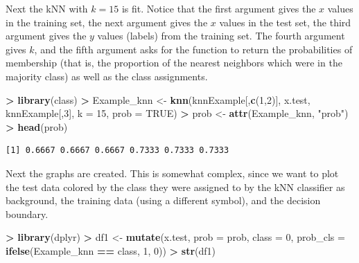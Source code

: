 \documentclass[
]{krantz}
\makeatletter
\newenvironment{Shaded}{\begin{snugshade}}{\end{snugshade}}
\newcommand{\DataTypeTok}[1]{\textcolor[rgb]{0.27,0.27,0.27}{#1}}
\newcommand{\DecValTok}[1]{\textcolor[rgb]{0.06,0.06,0.06}{#1}}
\newcommand{\KeywordTok}[1]{\textcolor[rgb]{0.27,0.27,0.27}{\textbf{#1}}}
\newcommand{\NormalTok}[1]{#1}
\newcommand{\OperatorTok}[1]{\textcolor[rgb]{0.43,0.43,0.43}{\textbf{#1}}}
\newcommand{\OtherTok}[1]{\textcolor[rgb]{0.37,0.37,0.37}{#1}}
\newcommand{\StringTok}[1]{\textcolor[rgb]{0.5,0.5,0.5}{#1}}
\newenvironment{kframe}{%
\medskip{}
\setlength{\fboxsep}{.8em}
 \def\at@end@of@kframe{}%
 \ifinner\ifhmode%
  \def\at@end@of@kframe{\end{minipage}}%
  \begin{minipage}{\columnwidth}%
 \fi\fi%
 \def\FrameCommand##1{\hskip\@totalleftmargin \hskip-\fboxsep
 \colorbox{shadecolor}{##1}\hskip-\fboxsep
     \hskip-\linewidth \hskip-\@totalleftmargin \hskip\columnwidth}%
 \MakeFramed {\advance\hsize-\width
   \@totalleftmargin\z@ \linewidth\hsize
   \@setminipage}}%
 {\par\unskip\endMakeFramed%
 \at@end@of@kframe}
\renewenvironment{Shaded}{\begin{kframe}}{\end{kframe}}
\makeatother
\begin{document}
Next the kNN with \(k=15\) is fit. Notice that the first argument gives the \(x\) values in the training set, the next argument gives the \(x\) values in the test set, the third argument gives the \(y\) values (labels) from the training set. The fourth argument gives \(k\), and the fifth argument asks for the function to return the probabilities of membership (that is, the proportion of the nearest neighbors which were in the majority class) as well as the class assignments.

\begin{Shaded}
\begin{Highlighting}[]
\OperatorTok{\textgreater{}}\StringTok{ }\KeywordTok{library}\NormalTok{(class)}
\OperatorTok{\textgreater{}}\StringTok{ }\NormalTok{Example\_knn \textless{}{-}}\StringTok{ }\KeywordTok{knn}\NormalTok{(knnExample[,}\KeywordTok{c}\NormalTok{(}\DecValTok{1}\NormalTok{,}\DecValTok{2}\NormalTok{)], x.test, knnExample[,}\DecValTok{3}\NormalTok{], }\DataTypeTok{k =} \DecValTok{15}\NormalTok{, }\DataTypeTok{prob =} \OtherTok{TRUE}\NormalTok{)}
\OperatorTok{\textgreater{}}\StringTok{ }\NormalTok{prob \textless{}{-}}\StringTok{ }\KeywordTok{attr}\NormalTok{(Example\_knn, }\StringTok{"prob"}\NormalTok{)}
\OperatorTok{\textgreater{}}\StringTok{ }\KeywordTok{head}\NormalTok{(prob)}
\end{Highlighting}
\end{Shaded}

\begin{verbatim}
[1] 0.6667 0.6667 0.6667 0.7333 0.7333 0.7333
\end{verbatim}

Next the graphs are created. This is somewhat complex, since we want to plot the test data colored by the class they were assigned to by the kNN classifier as background, the training data (using a different symbol), and the decision boundary.

\begin{Shaded}
\begin{Highlighting}[]
\OperatorTok{\textgreater{}}\StringTok{ }\KeywordTok{library}\NormalTok{(dplyr)}
\OperatorTok{\textgreater{}}\StringTok{ }\NormalTok{df1 \textless{}{-}}\StringTok{ }\KeywordTok{mutate}\NormalTok{(x.test, }\DataTypeTok{prob =}\NormalTok{ prob, }\DataTypeTok{class =} \DecValTok{0}\NormalTok{,  }\DataTypeTok{prob\_cls =} \KeywordTok{ifelse}\NormalTok{(Example\_knn }\OperatorTok{==}\StringTok{ }\NormalTok{class, }\DecValTok{1}\NormalTok{, }\DecValTok{0}\NormalTok{))}
\OperatorTok{\textgreater{}}\StringTok{ }\KeywordTok{str}\NormalTok{(df1)}
\end{Highlighting}
\end{Shaded}
\end{document}
